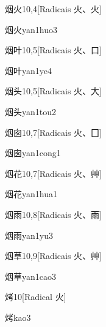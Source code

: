 \begin{entry}{烟火}{10,4}[Radicais ⽕、⽕]
  \begin{phonetics}{烟火}{yan1huo3}
  \end{phonetics}
\end{entry}

\begin{entry}{烟叶}{10,5}[Radicais ⽕、⼝]
  \begin{phonetics}{烟叶}{yan1ye4}
  \end{phonetics}
\end{entry}

\begin{entry}{烟头}{10,5}[Radicais ⽕、⼤]
  \begin{phonetics}{烟头}{yan1tou2}
  \end{phonetics}
\end{entry}

\begin{entry}{烟囱}{10,7}[Radicais ⽕、⼞]
  \begin{phonetics}{烟囱}{yan1cong1}
  \end{phonetics}
\end{entry}

\begin{entry}{烟花}{10,7}[Radicais ⽕、⾋]
  \begin{phonetics}{烟花}{yan1hua1}
  \end{phonetics}
\end{entry}

\begin{entry}{烟雨}{10,8}[Radicais ⽕、⾬]
  \begin{phonetics}{烟雨}{yan1yu3}
  \end{phonetics}
\end{entry}

\begin{entry}{烟草}{10,9}[Radicais ⽕、⾋]
  \begin{phonetics}{烟草}{yan1cao3}
  \end{phonetics}
\end{entry}

\begin{entry}{烤}{10}[Radical ⽕]
  \begin{phonetics}{烤}{kao3}
  \end{phonetics}
\end{entry}

